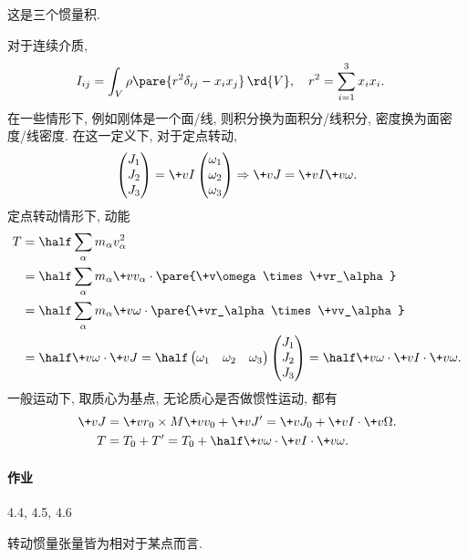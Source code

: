 \documentclass[../LectureNotes.tex]{subfiles}
\begin{document}
这是三个惯量积.
\par
对于连续介质,
\begin{align*}
    I_{ij} &= \int_V \rho\pare{r^2 \delta_{ij} - x_ix_j}\,\rd{V},\quad r^2 = \sum_{i=1}^3 x_i x_i.
\end{align*}
在一些情形下, 例如刚体是一个面/线, 则积分换为面积分/线积分, 密度换为面密度/线密度. 在这一定义下, 对于定点转动,
\[ \begin{pmatrix}
    J_1 \\ J_2 \\ J_3
\end{pmatrix} = \+vI \begin{pmatrix}
    \omega_1 \\ \omega_2 \\ \omega_3
\end{pmatrix}\Rightarrow \+vJ = \+vI \+v\omega. \]
定点转动情形下, 动能
\begin{align*}
    T &= \half \sum_\alpha m_\alpha v_\alpha^2 \\
    &= \half \sum_\alpha m_\alpha \+vv_\alpha\cdot\pare{\+v\omega\times\+vr_\alpha} \\
    &= \half\sum_\alpha m_\alpha \+v\omega \cdot\pare{\+vr_\alpha\times\+vv_\alpha} \\
    &= \half \+v\omega\cdot\+vJ = \half \begin{pmatrix}
        \omega_1 & \omega_2 & \omega_3
    \end{pmatrix} \begin{pmatrix}
        J_1 \\ J_2 \\ J_3
    \end{pmatrix} = \half \+v\omega \cdot \+vI\cdot \+v\omega.
\end{align*}
一般运动下, 取质心为基点, 无论质心是否做惯性运动, 都有
\begin{align*}
    \+vJ &= \+vr_0 \times M\+vv_0 + \+vJ' = \+vJ_0 + \+vI\cdot\+v\Omega. \\
    T &= T_0 + T' = T_0 + \half \+v\omega\cdot\+vI\cdot\+v\omega.
\end{align*}

\paragraph{作业} %
\label{par:作业}

4.4, 4.5, 4.6


\begin{pitfall}
    转动惯量张量皆为相对于某点而言.
\end{pitfall}
\end{document}
